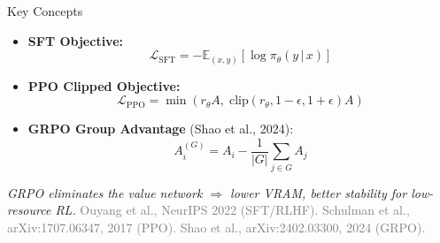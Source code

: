 \documentclass[10pt]{beamer}
\begin{document}
\begin{frame}{Key Concepts}
\large
\begin{itemize}
    \item \textbf{SFT Objective:}
    \[
        \mathcal{L}_{\text{SFT}} = - \mathbb{E}_{(x,y)}[\log \pi_\theta(y\,|\,x)]
    \]

    \item \textbf{PPO Clipped Objective:}
    \[
        \mathcal{L}_{\text{PPO}} = 
        \min\!\left(
            r_\theta A,\;
            \text{clip}(r_\theta, 1-\epsilon, 1+\epsilon) A
        \right)
    \]

    \item \textbf{GRPO Group Advantage} (Shao et al., 2024):
    \[
        A_i^{(G)} = A_i - \frac{1}{|G|} \sum_{j \in G} A_j
    \]
\end{itemize}

\vspace{0.3cm}
{\small \textit{GRPO eliminates the value network $\Rightarrow$ lower VRAM, better stability for low-resource RL.}}
\vspace{\fill}
{\tiny \textcolor{gray}{Ouyang et al., NeurIPS 2022 (SFT/RLHF). \quad Schulman et al., arXiv:1707.06347, 2017 (PPO). \quad Shao et al., arXiv:2402.03300, 2024 (GRPO).}}
\end{frame}
\end{document}
